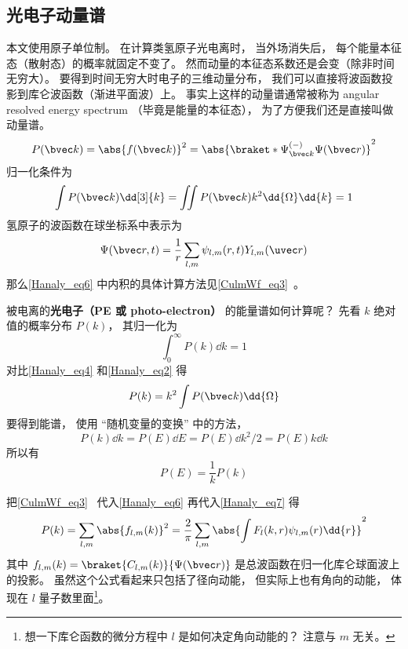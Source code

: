 

\subsection{光电子动量谱}

本文使用原子单位制。 在计算类氢原子光电离时， 当外场消失后， 每个能量本征态（散射态）的概率就固定不变了。 然而动量的本征态系数还是会变（除非时间无穷大）。 要得到时间无穷大时电子的三维动量分布， 我们可以直接将波函数投影到库仑波函数（渐进平面波）上。 事实上这样的动量谱通常被称为 angular resolved energy spectrum （毕竟是能量的本征态）， 为了方便我们还是直接叫做动量谱。
\begin{equation}\label{Hanaly_eq6}
P(\bvec k) = \abs{f(\bvec k)}^2 = \abs{\braket*{\Psi^{(-)}_{\bvec k}}{\Psi(\bvec r)}}^2
\end{equation}
归一化条件为
\begin{equation}\label{Hanaly_eq4}
\int P(\bvec k) \dd[3]{k} = \iint P(\bvec k) k^2\dd{\Omega}\dd{k} = 1
\end{equation}
氢原子的波函数在球坐标系中表示为
\begin{equation}
\Psi(\bvec r, t) = \frac{1}{r}\sum_{l,m} \psi_{l,m}(r, t) Y_{l,m}(\uvec r)
\end{equation}
那么\autoref{Hanaly_eq6} 中内积的具体计算方法见\autoref{CulmWf_eq3}~。

被电离的\textbf{光电子（PE 或 photo-electron）} 的能量谱如何计算呢？ 先看 $k$ 绝对值的概率分布 $P(k)$， 其归一化为
\begin{equation}\label{Hanaly_eq2}
\int_0^\infty P(k) \dd{k} = 1
\end{equation}
对比\autoref{Hanaly_eq4} 和\autoref{Hanaly_eq2} 得
\begin{equation}\label{Hanaly_eq7}
P(k) = k^2 \int P(\bvec k) \dd{\Omega}
\end{equation}
要得到能谱， 使用 “随机变量的变换” 中的方法，
\begin{equation}\label{Hanaly_eq1}
P(k)\dd{k} = P(E)\dd{E} = P(E)\dd{k^2/2} = P(E)k\dd{k}
\end{equation}
所以有
\begin{equation}
P(E) = \frac{1}{k}P(k)
\end{equation}

把\autoref{CulmWf_eq3}~ 代入\autoref{Hanaly_eq6} 再代入\autoref{Hanaly_eq7} 得
\begin{equation}
P(k) = \sum_{l,m} \abs{f_{l,m}(k)}^2 = \frac{2}{\pi} \sum_{l,m} \abs{\int F_l(k, r) \psi_{l,m}(r) \dd{r}}^2
\end{equation}
其中 $f_{l,m}(k) = \braket{C_{l,m}(k)}{\Psi(\bvec r)}$ 是总波函数在归一化库仑球面波上的投影。 虽然这个公式看起来只包括了径向动能， 但实际上也有角向的动能， 体现在 $l$ 量子数里面\footnote{想一下库仑函数的微分方程中 $l$ 是如何决定角向动能的？ 注意与 $m$ 无关。}。

